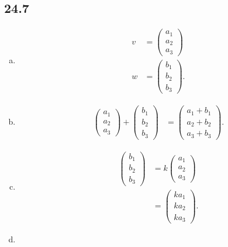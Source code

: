 \documentclass[12pt]{mypackage}
\begin{document}
\subsection{24.7}%
\begin{enumerate}[(a)]
  \item 
    \begin{align*}
      v &= \begin{pmatrix}a_1\\a_2\\a_3\end{pmatrix}\\
      w &= \begin{pmatrix}b_1\\b_2\\b_3\end{pmatrix}.
    \end{align*}
  \item 
    \begin{align*}
      \begin{pmatrix}a_1\\a_2\\a_3\end{pmatrix} + \begin{pmatrix}b_1\\b_2\\b_3\end{pmatrix} &= \begin{pmatrix}a_1 + b_1\\a_2 + b_2\\a_3 + b_3\end{pmatrix}.
    \end{align*}
  \item 
    \begin{align*}
      \begin{pmatrix}b_1\\b_2\\b_3\end{pmatrix} &= k \begin{pmatrix}a_1\\a_2\\a_3\end{pmatrix}\\
                                                &= \begin{pmatrix}ka_1 \\ ka_2\\ka_3\end{pmatrix}.
    \end{align*}
  \item 

\end{enumerate}
\end{document}
